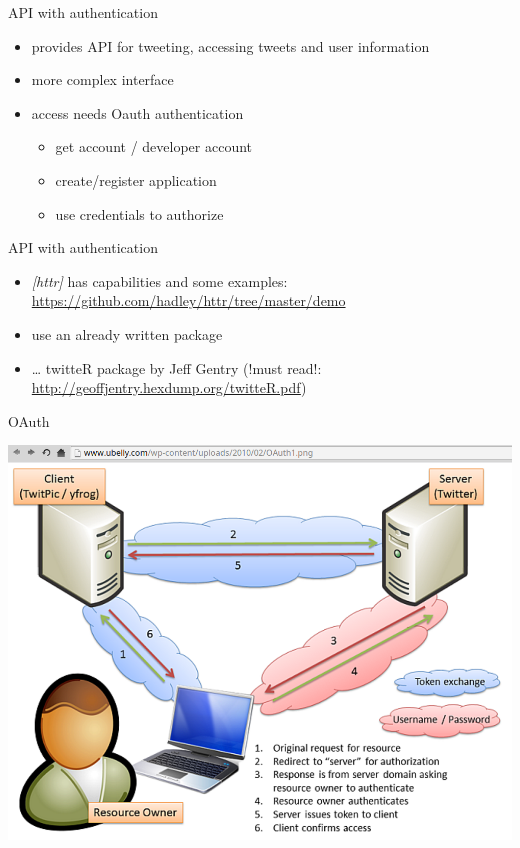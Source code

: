 \documentclass[ignorenonframetext,]{beamer}
\providecommand{\tightlist}{%
  \setlength{\itemsep}{0pt}\setlength{\parskip}{0pt}}
\begin{document}
\begin{frame}{API with authentication}

\begin{itemize}
\tightlist
\item
  provides API for tweeting, accessing tweets and user information
\item
  more complex interface
\item
  access needs Oauth authentication

  \begin{itemize}
  \tightlist
  \item
    get account / developer account
  \item
    create/register application
  \item
    use credentials to authorize
  \end{itemize}
\end{itemize}

\end{frame}

\begin{frame}{API with authentication}

\begin{itemize}
\tightlist
\item
  \emph{{[}httr{]}} has capabilities and some examples:
  \url{https://github.com/hadley/httr/tree/master/demo}
\item
  use an already written package
\item
  \ldots{} twitteR package by Jeff Gentry (!must read!:
  \url{http://geoffjentry.hexdump.org/twitteR.pdf})
\end{itemize}

\end{frame}

\begin{frame}{OAuth}

\includegraphics{fig/oauth.png}

\end{frame}
\end{document}
